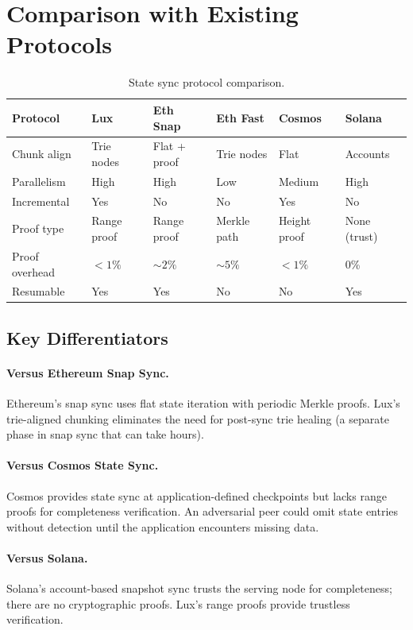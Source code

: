\section{Comparison with Existing Protocols}
\label{sec:comparison}

\begin{table}[H]
\centering
\caption{State sync protocol comparison.}
\label{tab:comparison}
\begin{tabular}{p{2.5cm}p{2cm}p{2cm}p{2cm}p{2cm}p{2cm}}
\toprule
\textbf{Protocol} & \textbf{Lux} & \textbf{Eth Snap} & \textbf{Eth Fast} & \textbf{Cosmos} & \textbf{Solana} \\
\midrule
Chunk align & Trie nodes & Flat + proof & Trie nodes & Flat & Accounts \\
Parallelism & High & High & Low & Medium & High \\
Incremental & Yes & No & No & Yes & No \\
Proof type & Range proof & Range proof & Merkle path & Height proof & None (trust) \\
Proof overhead & $< 1\%$ & $\sim 2\%$ & $\sim 5\%$ & $< 1\%$ & 0\% \\
Resumable & Yes & Yes & No & No & Yes \\
\bottomrule
\end{tabular}
\end{table}

\subsection{Key Differentiators}

\paragraph{Versus Ethereum Snap Sync.} Ethereum's snap sync uses flat state iteration with periodic Merkle proofs. Lux's trie-aligned chunking eliminates the need for post-sync trie healing (a separate phase in snap sync that can take hours).

\paragraph{Versus Cosmos State Sync.} Cosmos provides state sync at application-defined checkpoints but lacks range proofs for completeness verification. An adversarial peer could omit state entries without detection until the application encounters missing data.

\paragraph{Versus Solana.} Solana's account-based snapshot sync trusts the serving node for completeness; there are no cryptographic proofs. Lux's range proofs provide trustless verification.

